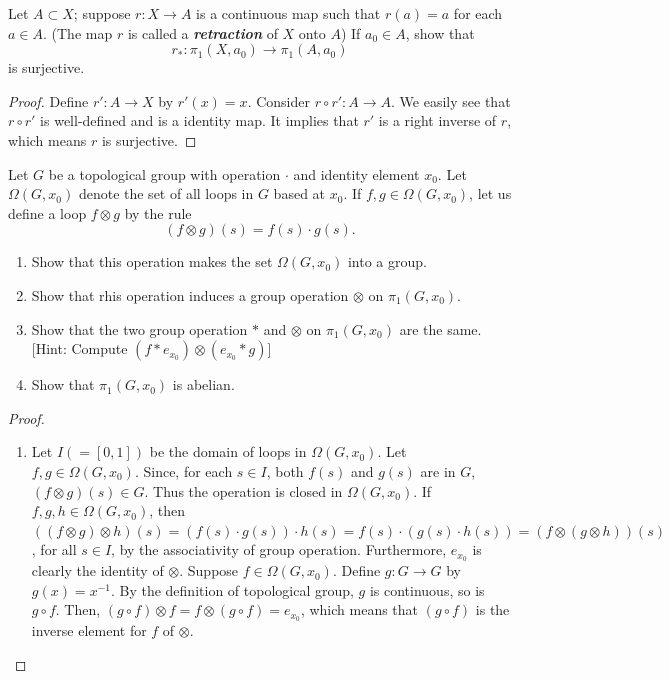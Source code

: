 \documentclass{article}
\begin{document}
\begin{multicols}{2}
\begin{exercise}
Let $A\subset X$; suppose $r:X\to A$ is a continuous map such that $r(a)=a$ for each $a\in A$. (The map $r$ is called a \textbf{\emph{retraction}} of $X$ onto $A$) If $a_0\in A$, show that
$$ r_*:\pi_1(X,a_0)\to \pi_1(A,a_0)$$
is surjective.
\end{exercise}
\begin{proof}
Define $r':A\to X$ by $r'(x) = x$. Consider $r\circ r':A\to A$. We easily see that $r\circ r'$ is well-defined and is a identity map. It implies that $r'$ is a right inverse of $r$, which means $r$ is surjective.
\end{proof}

\begin{exercise}
Let $G$ be a topological group with operation $\cdot$ and identity element $x_0$. Let $\Omega (G,x_0)$ denote the set of all loops in $G$ based at $x_0$. If $f,g\in \Omega (G,x_0)$, let us define a loop $f\otimes g$ by the rule
$$(f\otimes g)(s)=f(s)\cdot g(s).$$
\begin{enumerate}[label={(\alph*)}]
\item Show that this operation makes the set $\Omega (G,x_0)$ into a group.
\item Show that rhis operation induces a group operation $\otimes$ on $\pi_1 (G,x_0)$.
\item Show that the two group operation $*$ and $\otimes$ on $\pi_1(G,x_0)$ are the same.[Hint: Compute $(f*e_{x_0})\otimes (e_{x_0}*g)$]
\item Show that $\pi_1(G,x_0)$ is abelian.
\end{enumerate}
\end{exercise}
\begin{proof}
\begin{enumerate}[label={(\alph*)}]
\item Let $I(=[0,1])$ be the domain of loops in $\Omega(G,x_0)$. Let $f,g\in \Omega(G,x_0)$. Since, for each $s\in I$, both $f(s)$ and $g(s)$ are in $G$, $(f\otimes g)(s)\in G$. Thus the operation is closed in $\Omega(G,x_0)$. If  $f,g,h\in \Omega(G,x_0)$, then $((f\otimes g)\otimes h)(s) =(f(s)\cdot g(s))\cdot h(s) = f(s)\cdot(g(s)\cdot h(s))=(f\otimes (g\otimes h))(s)$, for all $s\in I$, by the associativity of group operation. Furthermore, $e_{x_0}$ is clearly the identity of $\otimes$. Suppose $f\in \Omega(G,x_0)$. Define $g:G\to G$ by $g(x) = x^{-1}$. By the definition of topological group, $g$ is continuous, so is $g\circ f$. Then, $(g\circ f)\otimes f = f\otimes (g\circ f)=e_{x_0}$, which means that $(g\circ f)$ is the inverse element for $f$ of $\otimes$.

\end{enumerate}
\end{proof}
\end{multicols}
\end{document}
